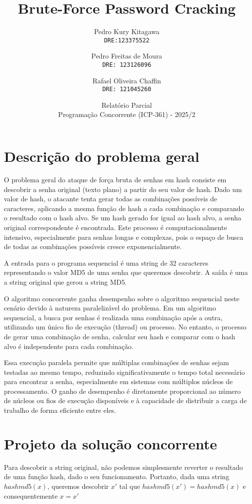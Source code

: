\documentclass[12pt, a4paper]{article}
\title{Brute-Force Password Cracking}
\author{
  Pedro Kury Kitagawa\\
  \texttt{DRE:123375522}
  \and
  Pedro Freitas de Moura\\
  \texttt{DRE: 123126096}
  \and
  Rafael Oliveira Chaffin\\
  \texttt{DRE: 121045260}
}
\date{Relatório Parcial \\ Programação Concorrente (ICP-361) - 2025/2}
\begin{document}
\maketitle
\thispagestyle{empty}

\section{Descrição do problema geral}
O problema geral do ataque de força bruta de senhas em hash consiste em descobrir a senha original (texto plano) a partir do seu valor de hash. Dado um valor de hash, o atacante tenta gerar todas as combinações possíveis de caracteres, aplicando a mesma função de hash a cada combinação e comparando o resultado com o hash alvo. Se um hash gerado for igual ao hash alvo, a senha original correspondente é encontrada. Este processo é computacionalmente intensivo, especialmente para senhas longas e complexas, pois o espaço de busca de todas as combinações possíveis cresce exponencialmente.

A entrada para o programa sequencial é uma string de 32 caracteres representando o valor MD5 de uma senha que queremos descobrir. A saída é uma a string original que gerou a string MD5.

O algoritmo concorrente ganha desempenho sobre o algoritmo sequencial neste cenário devido à natureza paralelizável do problema. Em um algoritmo sequencial, a busca por senhas é realizada uma combinação após a outra, utilizando um único fio de execução (thread) ou processo. No entanto, o processo de gerar uma combinação de senha, calcular seu hash e comparar com o hash alvo é independente para cada combinação.

Essa execução paralela  permite que múltiplas combinações de senhas sejam testadas ao mesmo tempo, reduzindo significativamente o tempo total necessário para encontrar a senha, especialmente em sistemas com múltiplos núcleos de processamento. O ganho de desempenho é diretamente proporcional ao número de núcleos ou fios de execução disponíveis e à capacidade de distribuir a carga de trabalho de forma eficiente entre eles.

\section{Projeto da solução concorrente}
Para descobrir a string original, não podemos simplesmente reverter o resultado de uma função hash, dado o seu funcionamento. Portanto, dada uma string $hashmd5(x)$, queremos descobrir $x'$ tal que $hashmd5(x')=hashmd5(x)$ e consequentemente $x = x'$ 
\end{document}

